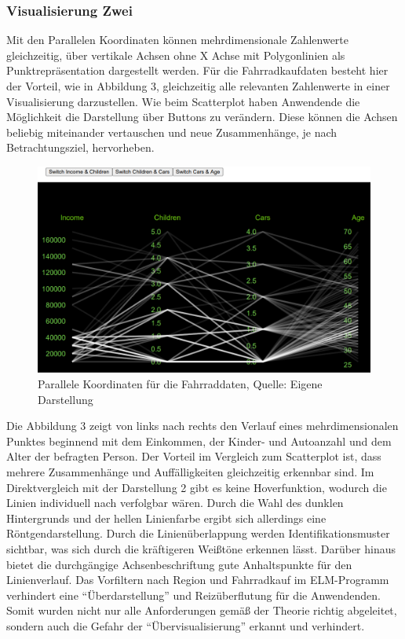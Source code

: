 \documentclass[usegeometry=true]{scrartcl}
\begin{document}
\subsubsection{Visualisierung Zwei}
Mit den Parallelen Koordinaten können mehrdimensionale Zahlenwerte gleichzeitig, über vertikale Achsen ohne X Achse mit Polygonlinien als Punktrepräsentation dargestellt werden.
Für die Fahrradkaufdaten besteht hier der Vorteil, wie in Abbildung 3, gleichzeitig alle relevanten Zahlenwerte in einer Visualisierung darzustellen.   Wie beim Scatterplot haben Anwendende die Möglichkeit die Darstellung über Buttons zu verändern. Diese können die Achsen beliebig miteinander vertauschen  und neue Zusammenhänge, je nach Betrachtungsziel, hervorheben. 
\begin{figure}[h]
\begin{center}
\includegraphics[width=16cm]{Bilder/V2ParalleleKoordinaten.png}
\caption{Parallele Koordinaten für die Fahrraddaten, Quelle: Eigene Darstellung}
\end{center}
\end{figure}
\newline Die Abbildung 3 zeigt von links nach rechts den Verlauf eines mehrdimensionalen Punktes beginnend mit dem Einkommen, der Kinder- und Autoanzahl und dem Alter der befragten Person. Der Vorteil im Vergleich zum Scatterplot ist, dass mehrere Zusammenhänge und Auffälligkeiten gleichzeitig erkennbar sind. Im Direktvergleich mit der Darstellung 2 gibt es keine Hoverfunktion, wodurch die Linien individuell nach verfolgbar wären. Durch die Wahl des dunklen Hintergrunds und der hellen Linienfarbe ergibt sich allerdings eine Röntgendarstellung. Durch die Linienüberlappung werden Identifikationsmuster sichtbar, was sich durch die kräftigeren Weißtöne erkennen lässt. Darüber hinaus bietet die durchgängige Achsenbeschriftung gute Anhaltspunkte für den Linienverlauf. Das Vorfiltern nach Region und Fahrradkauf im ELM-Programm verhindert eine "`Überdarstellung"' und Reizüberflutung für die Anwendenden. Somit wurden nicht nur alle Anforderungen gemäß der Theorie richtig abgeleitet, sondern auch die Gefahr der "`Übervisualisierung"' erkannt und verhindert.
\end{document}
